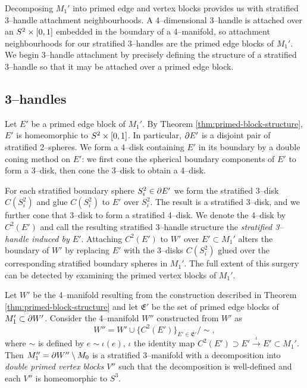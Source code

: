 Decomposing $M_1'$ into primed edge and vertex blocks provides us with stratified 3--handle attachment neighbourhoods.
A 4--dimensional 3--handle is attached over an $S^2\times[0,1]$ embedded in the boundary of a 4--manifold, so attachment neighbourhoods for our stratified 3--handles are the primed edge blocks of $M_1'$.
We begin 3--handle attachment by precisely defining the structure of a stratified 3--handle so that it may be attached over a primed edge block.

\subsection{3--handles}

Let $E'$ be a primed edge block of $M_1'$.
By Theorem \ref{thm:primed-block-structure}, $E'$ is homeomorphic to $S^2\times[0,1]$.
In particular, $\partial E'$ is a disjoint pair of stratified 2--spheres.
We form a 4--disk containing $E'$ in its boundary by a double coning method on $E'$: we first cone the spherical boundary components of $E'$ to form a 3--disk, then cone the 3--disk to obtain a 4--disk.


For each stratified boundary sphere $S_i^2\in\partial E'$ we form the stratified 3--disk $C(S_i^2)$ and glue $C(S_i^2)$ to $E'$ over $S_i^2$.
The result is a stratified 3--disk, and we further cone that 3--disk to form a stratified 4--disk.
We denote the 4--disk by $C^2(E')$ and call the resulting stratified 3--handle structure the \emph{stratified 3--handle induced by $E'$}.
Attaching $C^2(E')$ to $W'$ over $E'\subset M_1'$ alters the boundary of $W'$ by replacing $E'$ with the 3--disks $C(S_i^2)$ glued over the corresponding stratified boundary spheres in $M_1'$.
The full extent of this surgery can be detected by examining the primed vertex blocks of $M_1'$.

\begin{cor}
	\label{thm:primed-primed-block-structure}
	Let $W'$ be the 4--manifold resulting from the construction described in Theorem \ref{thm:primed-block-structure} and let $\mathfrak{E}'$ be the set of primed edge blocks of $M_1'\subset\partial W'$.
	Consider the 4--manifold $W''$ constructed from $W'$ as
	\[
	W'' = W'\cup\{C^2(E')\}_{E'\in \mathfrak{E}'} / \sim,
	\]
	where $\sim$ is defined by $e\sim \iota(e)$, $\iota$ the identity map $C^2(E')\supset E'\overset{\iota}{\to} E'\subset M_1'$.
	Then $M_1''=\partial W''\setminus M_0$ is a stratified 3--manifold with a decomposition into \emph{double primed vertex blocks} $V''$ such that the decomposition is well-defined and each $V''$ is homeomorphic to $S^3$.
\end{cor}

